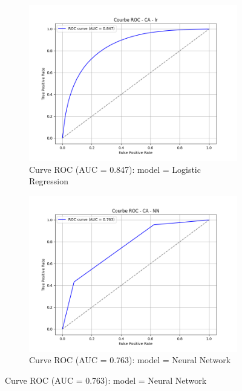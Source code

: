 \begin{figure}[h]
    \centering
    \begin{subfigure}[b]{0.48\textwidth}
        \includegraphics[width=\textwidth]{Images/curve_roc_folktables/roc_curve_CA_lr.png}
        \caption{Curve ROC (AUC = 0.847): model = Logistic Regression}
        \label{fig:ca_lr}
    \end{subfigure}
    \hfill
    \begin{subfigure}[b]{0.48\textwidth}
        \includegraphics[width=\textwidth]{Images/curve_roc_folktables/roc_curve_CA_NN.png}
        \caption{Curve ROC (AUC = 0.763): model = Neural Network}
        \label{fig:ca_nn}
    \end{subfigure}


\end{figure}
